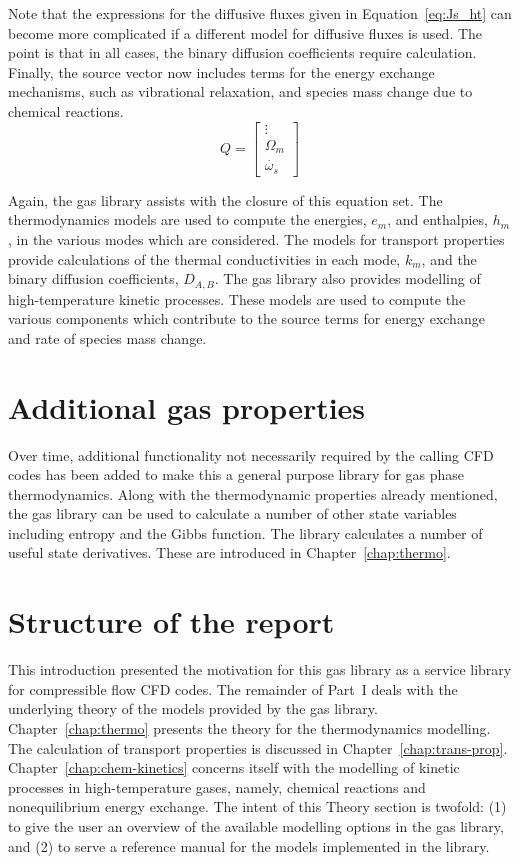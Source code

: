 Note that the expressions for the diffusive fluxes given in Equation~\ref{eq:Js_ht} can become more complicated if a different model for diffusive fluxes is used.
The point is that in all cases, the binary diffusion coefficients require calculation.
Finally, the source vector now includes terms for the energy exchange mechanisms,
such as vibrational relaxation, and species mass change due to chemical reactions.
\begin{equation}
Q  = \left [ \begin{array}{c} 
             \vdots \\
             \Omega_{m} \\
             \dot{\omega_s}
             \end{array} \right ]
\end{equation}

Again, the gas library assists with the closure of this equation set.
The thermodynamics models are used to compute the energies, $e_m$,
and enthalpies, $h_m$, in the various modes which are considered.
The models for transport properties provide calculations of
the thermal conductivities in each mode, $k_m$, and the binary
diffusion coefficients, $D_{A,B}$.
The gas library also provides modelling of high-temperature kinetic
processes.
These models are used to compute the various components which contribute
to the source terms for energy exchange and rate of species mass change.

\section{Additional gas properties}
Over time, additional functionality not necessarily required by the calling
CFD codes has been added to make this a general purpose library for
gas phase thermodynamics.
Along with the thermodynamic properties already mentioned, the gas library can be used to
calculate a number of other state variables including entropy and the Gibbs function.
The library calculates a number of useful state derivatives.
These are introduced in Chapter~\ref{chap:thermo}.

\section{Structure of the report}

This introduction presented the motivation for this gas library as a service library
for compressible flow CFD codes.
The remainder of Part~I deals with the underlying theory of the models provided
by the gas library.
Chapter~\ref{chap:thermo} presents the theory for the thermodynamics modelling.
The calculation of transport properties is discussed in Chapter~\ref{chap:trans-prop}.
Chapter~\ref{chap:chem-kinetics} concerns itself with the modelling of kinetic processes
in high-temperature gases, namely, chemical reactions and nonequilibrium energy exchange.
The intent of this Theory section is twofold: (1) to give the user an overview of the available modelling options in the gas library, and (2) to serve a reference manual for the models implemented in the library.


